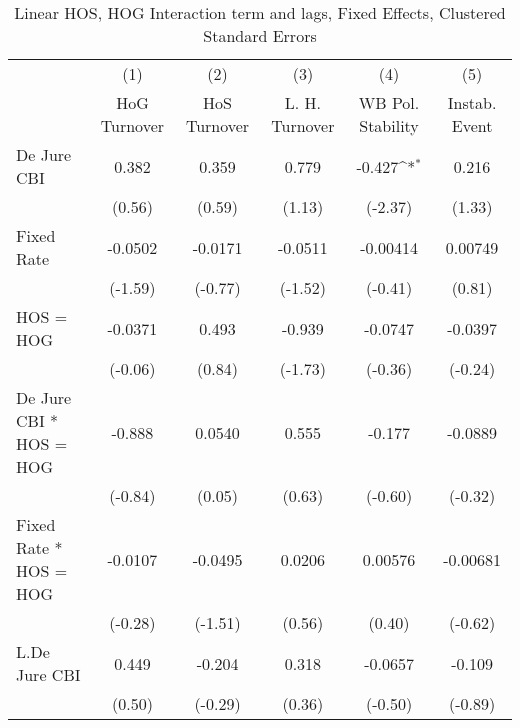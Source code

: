 {
\def\sym#1{\ifmmode^{#1}\else\(^{#1}\)\fi}
\begin{longtable}{l*{5}{c}}
\caption{Linear HOS, HOG Interaction term and lags, Fixed Effects, Clustered Standard Errors \label{hoshogintlagsDJ}}\\
\hline\hline\endfirsthead\hline\endhead\hline\endfoot\endlastfoot
                &\multicolumn{1}{c}{(1)}&\multicolumn{1}{c}{(2)}&\multicolumn{1}{c}{(3)}&\multicolumn{1}{c}{(4)}&\multicolumn{1}{c}{(5)}\\
                &\multicolumn{1}{c}{HoG Turnover}&\multicolumn{1}{c}{HoS Turnover}&\multicolumn{1}{c}{L. H. Turnover}&\multicolumn{1}{c}{WB Pol. Stability}&\multicolumn{1}{c}{Instab. Event}\\
\hline
De Jure CBI     &    0.382         &    0.359         &    0.779         &   -0.427\sym{*}  &    0.216         \\
                &   (0.56)         &   (0.59)         &   (1.13)         &  (-2.37)         &   (1.33)         \\
[1em]
Fixed Rate      &  -0.0502         &  -0.0171         &  -0.0511         & -0.00414         &  0.00749         \\
                &  (-1.59)         &  (-0.77)         &  (-1.52)         &  (-0.41)         &   (0.81)         \\
[1em]
HOS = HOG       &  -0.0371         &    0.493         &   -0.939         &  -0.0747         &  -0.0397         \\
                &  (-0.06)         &   (0.84)         &  (-1.73)         &  (-0.36)         &  (-0.24)         \\
[1em]
De Jure CBI * HOS = HOG&   -0.888         &   0.0540         &    0.555         &   -0.177         &  -0.0889         \\
                &  (-0.84)         &   (0.05)         &   (0.63)         &  (-0.60)         &  (-0.32)         \\
[1em]
Fixed Rate * HOS = HOG&  -0.0107         &  -0.0495         &   0.0206         &  0.00576         & -0.00681         \\
                &  (-0.28)         &  (-1.51)         &   (0.56)         &   (0.40)         &  (-0.62)         \\
[1em]
L.De Jure CBI   &    0.449         &   -0.204         &    0.318         &  -0.0657         &   -0.109         \\
                &   (0.50)         &  (-0.29)         &   (0.36)         &  (-0.50)         &  (-0.89)         \\

\end{longtable}}
